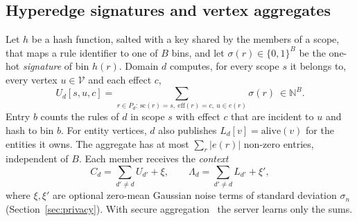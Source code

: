 \documentclass[preprint,12pt]{elsarticle}
\theoremstyle{definition}
\newcommand{\eff}{\mathrm{eff}}
\newcommand{\scp}{\mathrm{sc}}
\begin{document}
\subsection{Hyperedge signatures and vertex aggregates}
\label{sec:agg}
Let $h$ be a hash function, salted with a key shared by the members of a scope, that maps a rule identifier to one of $B$ bins, and let $\sigma(r)\in\{0,1\}^B$ be the one-hot \emph{signature} of bin $h(r)$. Domain $d$ computes, for every scope $s$ it belongs to, every vertex $u\in\mathcal{V}$ and each effect $c$,
\begin{equation}
U_d[s,u,c]=\sum_{r\in P_d:\ \scp(r)=s,\ \eff(r)=c,\ u\in e(r)}\sigma(r)\ \in\mathbb{N}^B .
\label{eq:agg}
\end{equation}
Entry $b$ counts the rules of $d$ in scope $s$ with effect $c$ that are incident to $u$ and hash to bin $b$. For entity vertices, $d$ also publishes $L_d[v]=\mathrm{alive}(v)$ for the entities it owns. The aggregate has at most $\sum_r |e(r)|$ non-zero entries, independent of $B$. Each member receives the \emph{context}
\begin{equation}
C_d=\sum_{d'\neq d}U_{d'}+\xi,\qquad \Lambda_d=\sum_{d'\neq d}L_{d'}+\xi',
\label{eq:ctx}
\end{equation}
where $\xi,\xi'$ are optional zero-mean Gaussian noise terms of standard deviation $\sigma_{\!n}$ (Section~\ref{sec:privacy}). With secure aggregation~\cite{bonawitz2017practical} the server learns only the sums.
\end{document}

